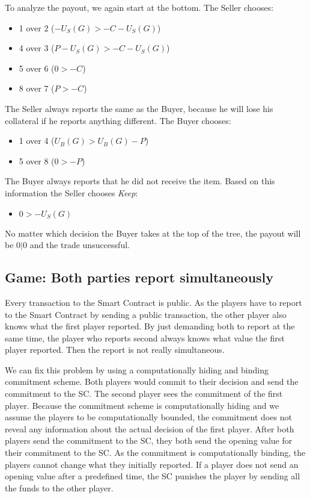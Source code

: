 \documentclass{cacthesis}
\begin{document}
To analyze the payout, we again start at the bottom. The Seller chooses:
\begin{itemize}
    \item 1 over 2 ($-U_S(G)>-C - U_S(G)$)
    \item 4 over 3 ($P-U_S(G)> -C-U_S(G)$)
    \item 5 over 6 ($0 > -C$)
    \item 8 over 7 ($P > -C$)
\end{itemize}
The Seller always reports the same as the Buyer, because he will lose his collateral if he reports anything different.\newline
The Buyer chooses:
\begin{itemize}
    \item 1 over 4 ($U_B(G)>U_B(G) - P$)
    \item 5 over 8 ($0>-P$)
\end{itemize}
The Buyer always reports that he did not receive the item. Based on this information the Seller chooses \emph{Keep}:
\begin{itemize}
    \item $0 > -U_S(G)$
\end{itemize}
No matter which decision the Buyer takes at the top of the tree, the payout will be $0|0$ and the trade unsuccessful.


\subsection{Game: Both parties report simultaneously}
 Every transaction to the Smart Contract is public. As the players have to
 report to the Smart Contract by sending a public transaction, the other player
 also knows what the first player reported. By just demanding both to report at
 the same time, the player who reports second always knows what value the first player reported. Then the report is not really simultaneous.\newline

 We can fix this problem by using a computationally hiding and binding commitment scheme. Both players would commit to their decision and send the commitment to the SC. The second player sees the commitment of the first player. Because the commitment scheme is computationally hiding and we assume the players to be computationally bounded, the commitment does not reveal any information about the actual decision of the first player.
 After both players send the commitment to the SC, they both send the opening
 value for their commitment to the SC. As the commitment is computationally
 binding, the players cannot change what they initially reported. If a player
 does not send an opening value after a predefined time, the SC punishes the
 player by sending all the funds to the other player.
\end{document}
